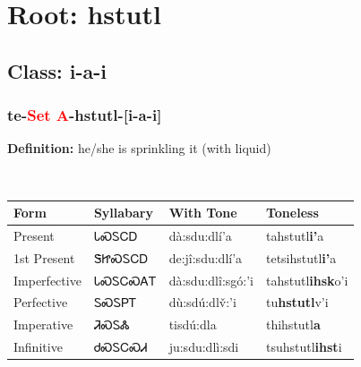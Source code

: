 \needspace{4in}
\section*{Root: hstutl}
\nopagebreak
{}
\needspace{3in}
\subsection*{Class: i-a-i}
\nopagebreak
\needspace{2in}
\subsubsection*{te{-}\textcolor{Red}{Set A}{-}\textbf{hstutl}{-}[i-a-i]}
\nopagebreak
\textbf{Definition: } he/she is sprinkling it (with liquid)
\\[0.5em]
\begin{tabularx}{\textwidth}{l X X X}%
\toprule%
\textbf{Form}&\textbf{Syllabary}&\textbf{With Tone}&\textbf{Toneless}\\%
\midrule%
Present&ᏓᏍᏚᏟᎠ&dà:sdu:dlí’a&tahstutl\textbf{i'}a\\%
1st Present&ᏕᏥᏍᏚᏟᎠ&de:jî:sdu:dlí’a&tetsihstutl\textbf{i'}a\\%
Imperfective&ᏓᏍᏚᏟᏍᎪᎢ&dà:sdu:dlî:sgó:’i&tahstutl\textbf{ihsk}o'i\\%
Perfective&ᏚᏍᏚᏢᎢ&dù:sdú:dlv̌:’i&tu\textbf{hstutl}v'i\\%
Imperative&ᏘᏍᏚᏜ&tisdú:dla&thihstutl\textbf{a}\\%
Infinitive&ᏧᏍᏚᏟᏍᏗ&ju:sdu:dlì:sdi&tsuhstutl\textbf{ihst}i\\%
\bottomrule%
\end{tabularx}
\\[1em]